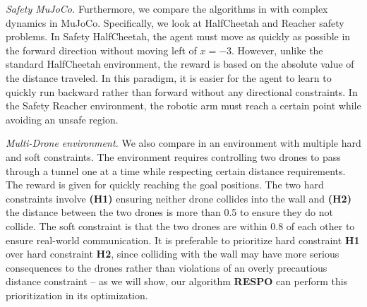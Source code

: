 \documentclass{article}
\theoremstyle{definition}
\begin{document}
\emph{Safety MuJoCo.} Furthermore, we compare the algorithms in with complex dynamics in MuJoCo. Specifically, we look at HalfCheetah and Reacher safety problems. In Safety HalfCheetah, the agent must move as quickly as possible in the forward direction without moving left of $x=-3$. However, unlike the standard HalfCheetah environment, the reward is based on the absolute value of the distance traveled. In this paradigm, it is easier for the agent to learn to quickly run backward rather than forward without any directional constraints. In the Safety Reacher environment, the robotic arm must reach a certain point while avoiding an unsafe region.

\emph{Multi-Drone environment.} We also compare in an environment with multiple hard and soft constraints. The environment requires controlling two drones to pass through a tunnel one at a time while respecting certain distance requirements. The reward is given for quickly reaching the goal positions. The two hard constraints involve \textbf{(H1)} ensuring neither drone collides into the wall and \textbf{(H2)} the distance between the two drones is more than 0.5 to ensure they do not collide. The soft constraint is that the two drones are within 0.8 of each other to ensure real-world communication. It is preferable to prioritize hard constraint \textbf{H1} over hard constraint \textbf{H2}, since colliding with the wall may have more serious consequences to the drones rather than violations of an overly precautious distance constraint -- as we will show, our algorithm \textbf{RESPO} can perform this prioritization in its optimization.

\newpage
\end{document}
